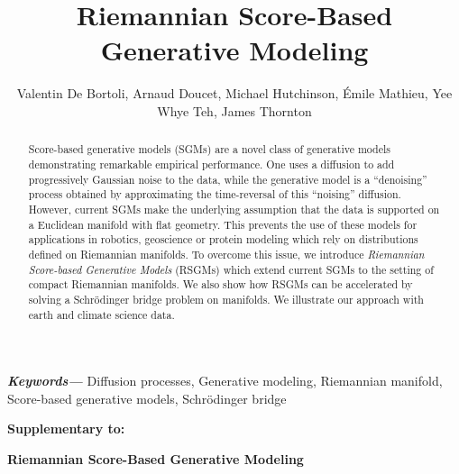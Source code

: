 \documentclass[11pt,a4paper]{article}
\title{Riemannian Score-Based Generative Modeling}
\author{Valentin De Bortoli, Arnaud Doucet, Michael Hutchinson, \'Emile Mathieu, Yee Whye Teh, James Thornton}
\affil{Oxford University}
\providecommand{\keywords}[1]
{
  \small	
  \textbf{\textit{Keywords---}} #1
}
\newcommand{\appendixhead}{
  \centerline{\textbf{\LARGE Supplementary to: }\vspace{0.15in}}
  \centerline{\textbf{\LARGE Riemannian Score-Based Generative Modeling}\vspace{0.25in}}
  }
\begin{document}
\maketitle

\begin{abstract}
  \small
 Score-based generative models (SGMs) are a novel class of generative models demonstrating remarkable empirical performance. One uses a diffusion to add progressively Gaussian noise to the data, while the generative model is a ``denoising'' process obtained by approximating the time-reversal of this ``noising'' diffusion. However, current SGMs make the underlying assumption that the data is supported on a Euclidean manifold with flat geometry. This prevents the use of these models for applications in
  robotics, geoscience or protein modeling which rely on distributions defined
  on Riemannian manifolds. To overcome this issue, we introduce \emph{Riemannian
    Score-based Generative Models} (RSGMs) which extend current SGMs to the
   setting of compact Riemannian manifolds. %
We also show how RSGMs can be accelerated by solving a Schr\"odinger bridge problem on manifolds. We illustrate our
approach with earth and climate science data.
\end{abstract}
\keywords{Diffusion processes, Generative modeling, Riemannian manifold, Score-based generative models, Schr\"odinger bridge}

















\newpage
\appendixhead
\appendix

\theoremstyle{plain}
\newtheorem{unlemma}{Lemma S}
\newtheorem{unproposition}{Proposition S}
\newtheorem{uncorollary}{Corollary S}
\newtheorem{untheorem}{Theorem S}

\setcounter{equation}{0}
\setcounter{figure}{0}
\setcounter{table}{0}
\setcounter{page}{1}
\makeatletter
\renewcommand{\theequation}{S\arabic{equation}}
\renewcommand{\thefigure}{S\arabic{figure}}
\renewcommand{\thetheorem}{S\arabic{theorem}}
\renewcommand{\thedefinition}{S\arabic{definition}}
\renewcommand{\thelemma}{S\arabic{lemma}}
\renewcommand{\thesection}{S\arabic{section}}
\renewcommand{\theremark}{S\arabic{remark}}
\renewcommand{\theproposition}{S\arabic{proposition}}
\renewcommand{\thecorollary}{S\arabic{corollary}}
\setcounter{tocdepth}{1}

















\end{document}
